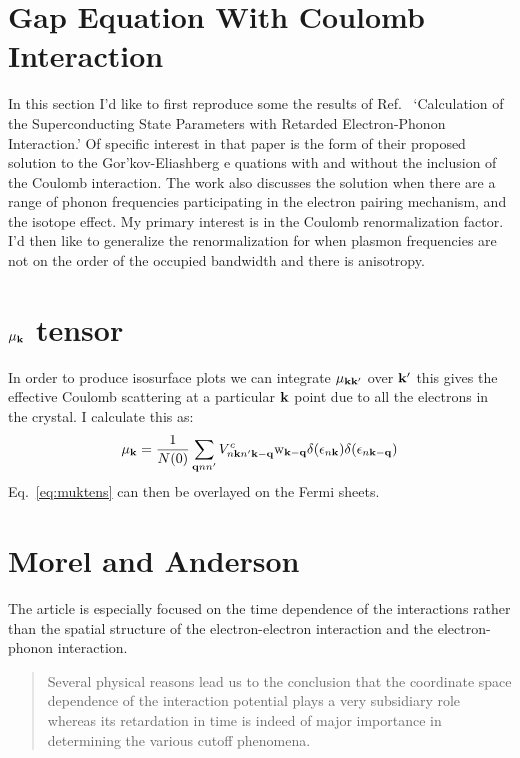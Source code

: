 \section{Gap Equation With Coulomb Interaction}
In this section I'd like to first reproduce some the results of Ref.~\cite{morel62} 
`Calculation of the Superconducting State Parameters with Retarded 
Electron-Phonon Interaction.' Of specific interest
in that paper is the form of their proposed solution to the Gor'kov-Eliashberg e
quations with and without the inclusion of the Coulomb interaction. 
The work also discusses the solution when there are a range of phonon
frequencies participating in the electron pairing mechanism, and the isotope effect. 
My primary interest is in the Coulomb renormalization factor. I'd then like 
to generalize the renormalization for when plasmon frequencies
are not on the order of the occupied bandwidth and there is anisotropy.
%
\section{$\mu_{{\bf k}}$ tensor}
%
In order to produce isosurface plots we can integrate $\mu_{{\bf k}{\bf k}'}$ over ${\bf k}'$ this
gives the effective Coulomb scattering at a particular ${\bf k}$ point due to 
all the electrons in the crystal. I calculate this as:
%
\begin{equation}
\label{eq:muktens}
\mu_{{\bf k}} = \frac{1}{N(0)}\sum_{{\bf q} nn'}V^{c}_{n{\bf k} n'{\bf k}-{\bf q}}{\rm w}_{{\bf k}-{\bf q}}\delta(\epsilon_{n{\bf k}})\delta(\epsilon_{n{\bf k}-{\bf q}})
\end{equation}
%
Eq.~\ref{eq:muktens} can then be overlayed on the Fermi sheets. 

\section{Morel and Anderson}
\label{sec:morelanderson}
The article is especially focused on the time dependence of the interactions rather than the
spatial structure of the electron-electron interaction and the electron-phonon interaction.
%
\begin{quote}
Several physical reasons lead us to the conclusion that the coordinate space dependence
of the interaction potential plays a very subsidiary role whereas its retardation 
in time is indeed of major importance in determining the various cutoff phenomena.
\end{quote}
%

